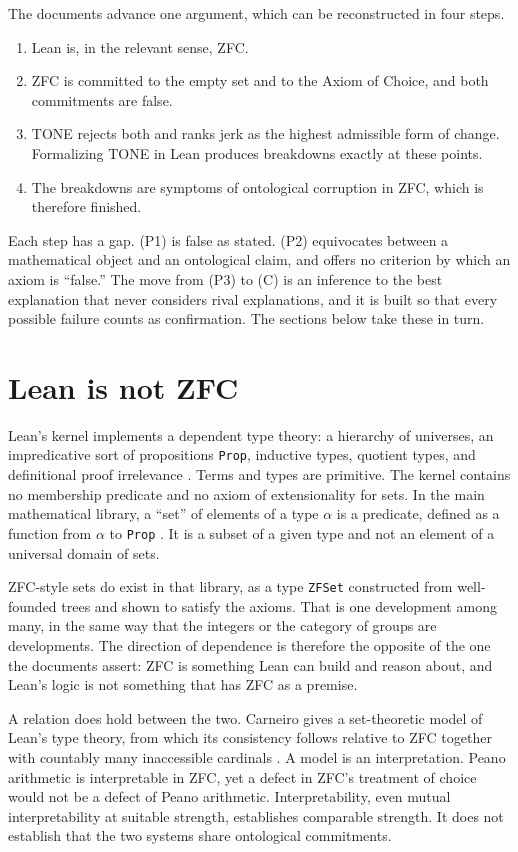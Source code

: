 \documentclass[11pt]{article}
\begin{document}
The documents advance one argument, which can be reconstructed in four steps.
\begin{enumerate}[label=(P\arabic*), leftmargin=3em]
\item Lean is, in the relevant sense, ZFC.
\item ZFC is committed to the empty set and to the Axiom of Choice, and both commitments are false.
\item TONE rejects both and ranks jerk as the highest admissible form of change. Formalizing TONE in Lean produces breakdowns exactly at these points.
\item[(C)] The breakdowns are symptoms of ontological corruption in ZFC, which is therefore finished.
\end{enumerate}
Each step has a gap. (P1) is false as stated. (P2) equivocates between a mathematical object and an ontological claim, and offers no criterion by which an axiom is ``false.'' The move from (P3) to (C) is an inference to the best explanation that never considers rival explanations, and it is built so that every possible failure counts as confirmation. The sections below take these in turn.

\section{Lean is not ZFC}

Lean's kernel implements a dependent type theory: a hierarchy of universes, an impredicative sort of propositions \texttt{Prop}, inductive types, quotient types, and definitional proof irrelevance \cite{demoura2021,carneiro2019}. Terms and types are primitive. The kernel contains no membership predicate and no axiom of extensionality for sets. In the main mathematical library, a ``set'' of elements of a type \texttt{$\alpha$} is a predicate, defined as a function from \texttt{$\alpha$} to \texttt{Prop} \cite{mathlib2020}. It is a subset of a given type and not an element of a universal domain of sets.

ZFC-style sets do exist in that library, as a type \texttt{ZFSet} constructed from well-founded trees and shown to satisfy the axioms. That is one development among many, in the same way that the integers or the category of groups are developments. The direction of dependence is therefore the opposite of the one the documents assert: ZFC is something Lean can build and reason about, and Lean's logic is not something that has ZFC as a premise.

A relation does hold between the two. Carneiro gives a set-theoretic model of Lean's type theory, from which its consistency follows relative to ZFC together with countably many inaccessible cardinals \cite{carneiro2019}. A model is an interpretation. Peano arithmetic is interpretable in ZFC, yet a defect in ZFC's treatment of choice would not be a defect of Peano arithmetic. Interpretability, even mutual interpretability at suitable strength, establishes comparable strength. It does not establish that the two systems share ontological commitments.
\end{document}
